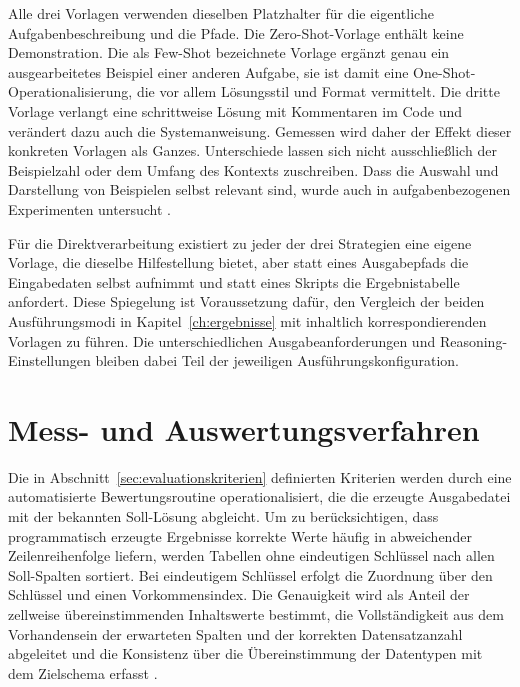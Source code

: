 Alle drei Vorlagen verwenden dieselben Platzhalter für die eigentliche Aufgabenbeschreibung und die Pfade. Die Zero-Shot-Vorlage enthält keine Demonstration. Die als Few-Shot bezeichnete Vorlage ergänzt genau ein ausgearbeitetes Beispiel einer anderen Aufgabe, sie ist damit eine One-Shot-Operationalisierung, die vor allem Lösungsstil und Format vermittelt. Die dritte Vorlage verlangt eine schrittweise Lösung mit Kommentaren im Code und verändert dazu auch die Systemanweisung. Gemessen wird daher der Effekt dieser konkreten Vorlagen als Ganzes. Unterschiede lassen sich nicht ausschließlich der Beispielzahl oder dem Umfang des Kontexts zuschreiben. Dass die Auswahl und Darstellung von Beispielen selbst relevant sind, wurde auch in aufgabenbezogenen Experimenten untersucht \autocite{narayanFoundationModelsWrangle2022}.

Für die Direktverarbeitung existiert zu jeder der drei Strategien eine eigene Vorlage, die dieselbe Hilfestellung bietet, aber statt eines Ausgabepfads die Eingabedaten selbst aufnimmt und statt eines Skripts die Ergebnistabelle anfordert. Diese Spiegelung ist Voraussetzung dafür, den Vergleich der beiden Ausführungsmodi in Kapitel~\ref{ch:ergebnisse} mit inhaltlich korrespondierenden Vorlagen zu führen. Die unterschiedlichen Ausgabeanforderungen und Reasoning-Einstellungen bleiben dabei Teil der jeweiligen Ausführungskonfiguration.

\section{Mess- und Auswertungsverfahren}
\label{sec:messverfahren}

Die in Abschnitt~\ref{sec:evaluationskriterien} definierten Kriterien werden durch eine automatisierte Bewertungsroutine operationalisiert, die die erzeugte Ausgabedatei mit der bekannten Soll-Lösung abgleicht. Um zu berücksichtigen, dass programmatisch erzeugte Ergebnisse korrekte Werte häufig in abweichender Zeilenreihenfolge liefern, werden Tabellen ohne eindeutigen Schlüssel nach allen Soll-Spalten sortiert. Bei eindeutigem Schlüssel erfolgt die Zuordnung über den Schlüssel und einen Vorkommensindex. Die Genauigkeit wird als Anteil der zellweise übereinstimmenden Inhaltswerte bestimmt, die Vollständigkeit aus dem Vorhandensein der erwarteten Spalten und der korrekten Datensatzanzahl abgeleitet und die Konsistenz über die Übereinstimmung der Datentypen mit dem Zielschema erfasst \autocite{ridzuanReviewDataQuality2024}.

